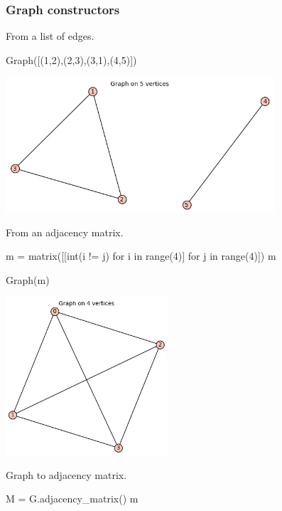 \subsubsection{Graph constructors}

From a list of edges.
\begin{sageCell}
    Graph([(1,2),(2,3),(3,1),(4,5)])
\end{sageCell}
\begin{outImage}
    \includegraphics[width=10cm]{Images/Introduction/output_edge_list.png}
\end{outImage}

From an adjacency matrix.
\begin{sageCell}
    m = matrix([[int(i != j) for i in range(4)] for j in range(4)])
    m
\end{sageCell}
\begin{outCell}
    [0 1 1 1]
    [1 0 1 1]
    [1 1 0 1]
    [1 1 1 0]
\end{outCell}

\begin{sageCell}
    Graph(m)
\end{sageCell}
\begin{outImage}
    \includegraphics[width=6cm]{Images/Introduction/output_adjacency_matrix.png}
\end{outImage}

Graph to adjacency matrix.
\begin{sageCell}
    M = G.adjacency_matrix()
    m
\end{sageCell}
\begin{outCell}
    [0 1 1 1 1 0 0]
    [1 0 0 0 0 0 1]
    [1 0 0 0 1 0 1]
    [1 0 0 0 0 0 1]
    [1 0 1 0 0 0 1]
    [0 0 0 0 0 0 1]
    [0 1 1 1 1 1 0]
\end{outCell}

